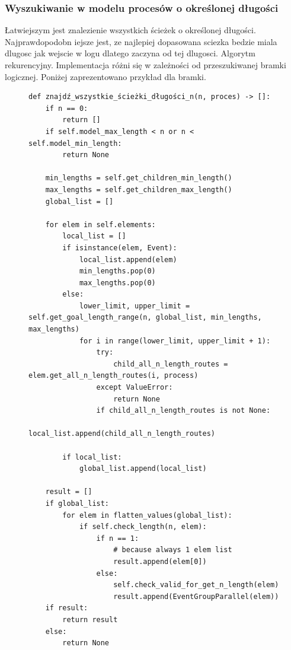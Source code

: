 \clearpage
\subsubsection{Wyszukiwanie w modelu procesów o określonej długości}

Łatwiejszym jest znalezienie wszystkich ścieżek o określonej długości. Najprawdopodobn iejsze jest, ze najlepiej dopasowana sciezka bedzie miala dlugosc jak wejscie w logu dlatego zaczyna od tej dlugosci. 
Algorytm rekurencyjny. Implementacja różni się w zależności od przeszukiwanej bramki logicznej. Poniżej zaprezentowano przykład dla bramki.  
\begin{figure}[!ht]
\lstset{caption=Wyszukiwanie procesów o długości n, captionpos=b}
\lstset{label=src:get_n_length, frame=single}
\begin{lstlisting}[escapeinside=``]
def znajdź_wszystkie_ścieżki_długości_n(n, proces) -> []:
    if n == 0:
        return []
    if self.model_max_length < n or n < self.model_min_length:
        return None

    min_lengths = self.get_children_min_length()
    max_lengths = self.get_children_max_length()
    global_list = []

    for elem in self.elements:
        local_list = []
        if isinstance(elem, Event):
            local_list.append(elem)
            min_lengths.pop(0)
            max_lengths.pop(0)
        else:
            lower_limit, upper_limit = self.get_goal_length_range(n, global_list, min_lengths, max_lengths)
            for i in range(lower_limit, upper_limit + 1):
                try:
                    child_all_n_length_routes = elem.get_all_n_length_routes(i, process)
                except ValueError:
                    return None
                if child_all_n_length_routes is not None:
                    local_list.append(child_all_n_length_routes)

        if local_list:
            global_list.append(local_list)

    result = []
    if global_list:
        for elem in flatten_values(global_list):
            if self.check_length(n, elem):
                if n == 1:
                    # because always 1 elem list
                    result.append(elem[0])
                else:
                    self.check_valid_for_get_n_length(elem)
                    result.append(EventGroupParallel(elem))
    if result:
        return result
    else:
        return None
\end{lstlisting}
\end{figure}

